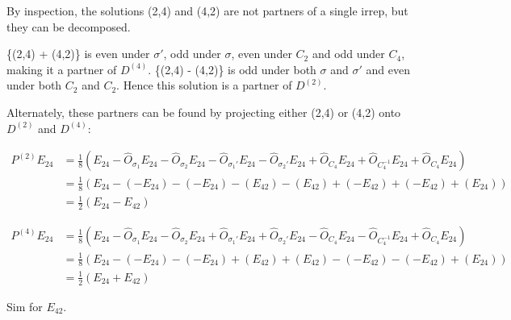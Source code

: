 \documentclass[aps,letterpaper,10pt]{article}
\begin{document}
By inspection, the solutions (2,4) and (4,2) are not partners of a single irrep, but they can be decomposed.

\{(2,4) + (4,2)\} is even under $\sigma'$, odd under $\sigma$, even under $C_2$ and odd under $C_4$, making it a partner of $D^{(4)}.$ \{(2,4) - (4,2)\} is odd under both $\sigma$ and $\sigma'$ and even under both $C_2$ and $C_2$. Hence this solution is a partner of $D^{(2)}.$ 

Alternately, these partners can be found by projecting either (2,4) or (4,2) onto $D^{(2)}$ and $D^{(4)}:$

\begin{align*}
P^{(2)} E_{24} & = \frac{1}{8} ( E_{24} - \hat{O}_{\sigma_1}E_{24} - \hat{O}_{\sigma_2}E_{24} - \hat{O}_{\sigma_1'}E_{24} - \hat{O}_{\sigma_2'}E_{24} + \hat{O}_{C_4}E_{24} + \hat{O}_{C_4^{-1}}E_{24} + \hat{O}_{C_4}E_{24}) \\
& = \frac{1}{8} (E_{24} - (-E_{24}) - (-E_{24}) - (E_{42}) - (E_{42}) + (-E_{42}) + (-E_{42}) + (E_{24})) \\ 
& = \frac{1}{2} (E_{24} - E_{42})
\end{align*}

\begin{align*}
P^{(4)} E_{24} & = \frac{1}{8} ( E_{24} - \hat{O}_{\sigma_1}E_{24} - \hat{O}_{\sigma_2}E_{24} + \hat{O}_{\sigma_1'}E_{24} + \hat{O}_{\sigma_2'}E_{24} - \hat{O}_{C_4}E_{24} - \hat{O}_{C_4^{-1}}E_{24} + \hat{O}_{C_4}E_{24}) \\
& = \frac{1}{8} (E_{24} - (-E_{24}) - (-E_{24}) + (E_{42}) + (E_{42}) - (-E_{42}) - (-E_{42}) + (E_{24})) \\ 
& = \frac{1}{2} (E_{24} + E_{42})
\end{align*}

Sim for $E_{42}.$
\end{document}
